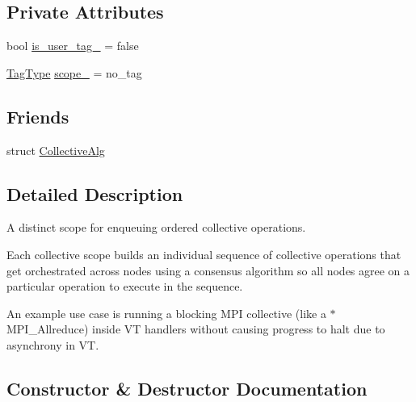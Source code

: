 \subsection*{Private Attributes}
\begin{DoxyCompactItemize}
\item 
bool \hyperlink{structvt_1_1collective_1_1_collective_scope_a2a291ca3421aab53d63088bd84fd7091}{is\+\_\+user\+\_\+tag\+\_\+} = false
\item 
\hyperlink{namespacevt_a84ab281dae04a52a4b243d6bf62d0e52}{Tag\+Type} \hyperlink{structvt_1_1collective_1_1_collective_scope_a6a1b0fe51f68913bd2aeaed363a5eab9}{scope\+\_\+} = no\+\_\+tag
\end{DoxyCompactItemize}
\subsection*{Friends}
\begin{DoxyCompactItemize}
\item 
struct \hyperlink{structvt_1_1collective_1_1_collective_scope_aa2494f91f09e2ba6a5baae9ee9de430e}{Collective\+Alg}
\end{DoxyCompactItemize}


\subsection{Detailed Description}
A distinct scope for enqueuing ordered collective operations. 

Each collective scope builds an individual sequence of collective operations that get orchestrated across nodes using a consensus algorithm so all nodes agree on a particular operation to execute in the sequence.

An example use case is running a blocking M\+PI collective (like a {\ttfamily $\ast$} M\+P\+I\+\_\+\+Allreduce) inside VT handlers without causing progress to halt due to asynchrony in VT. 

\subsection{Constructor \& Destructor Documentation}
\mbox{\label{structvt_1_1collective_1_1_collective_scope_a2b51fd570c218fc089caaded29fd17c9}} 

